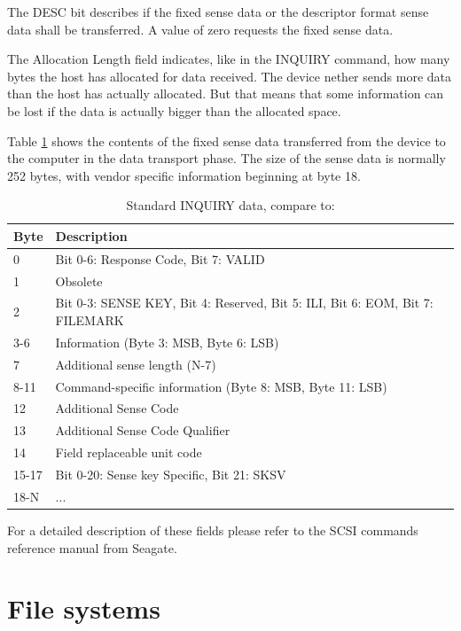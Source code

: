 The DESC bit describes if the fixed sense data or the descriptor format sense data shall be transferred. A value of zero requests the fixed sense data\cite{scsi_seagate}.

The Allocation Length field indicates, like in the INQUIRY command, how many bytes the host has allocated for data received. The device nether sends more data than the host has actually allocated. But that means that some information can be lost if the data is actually bigger than the allocated space.

Table \ref{table:sense_data} shows the contents of the fixed sense data transferred from the device to the computer in the data transport phase. The size of the sense data is normally 252 bytes, with vendor specific information beginning at byte 18.

\begin{table}[ht]
\caption{Standard INQUIRY data, compare to: \cite{usb_ms_jan, scsi_seagate}}
\centering
\begin{tabular}{|l|l|}
\hline\hline
\textbf{Byte} & \textbf{Description}\\ \hline
0 & Bit 0-6: Response Code, Bit 7: VALID \\ \hline
1 & Obsolete \\ \hline
2 & Bit 0-3: SENSE KEY, Bit 4: Reserved, Bit 5: ILI, Bit 6: EOM, Bit 7:  FILEMARK \\ \hline
3-6 & Information (Byte 3: MSB, Byte 6: LSB) \\ \hline
7 & Additional sense length (N-7) \\ \hline
8-11 & Command-specific information (Byte 8: MSB, Byte 11: LSB) \\ \hline
12 & Additional Sense Code \\ \hline
13 & Additional Sense Code Qualifier \\ \hline
14 & Field replaceable unit code \\ \hline
15-17 & Bit 0-20: Sense key Specific, Bit 21: SKSV \\ \hline
18-N & ... \\ \hline
\end{tabular}
\label{table:sense_data}
\end{table}

For a detailed description of these fields please refer to the SCSI commands reference manual from Seagate\cite{scsi_seagate}.

\chapter{File systems}

